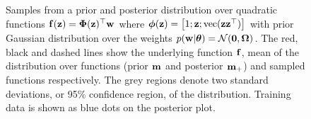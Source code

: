 \begin{figure}[t]
\centering
\small
{}
\hfill
{}
\caption{Samples from a prior and posterior distribution over quadratic functions $\mathbf{f}(\mathbf{z}) = \boldsymbol{\Phi}(\mathbf{z})^\top\mathbf{w}$ where $\boldsymbol{\phi}(\mathbf{z}) = \big[1; \mathbf{z}; \mathrm{vec}(\mathbf{z}\mathbf{z}^\top)\big]$ with prior Gaussian distribution over the weights $p(\mathbf{w}|\boldsymbol{\theta}) = \mathcal{N}(\mathbf{0},\boldsymbol{\Omega})$.  The red, black and dashed lines show the underlying function $\mathbf{f}$, mean of the distribution over functions (prior $\mathbf{m}$ and posterior $\mathbf{m}_+$) and sampled functions respectively. The grey regions denote two standard deviations, or 95\% confidence region, of the distribution. Training data is shown as blue dots on the posterior plot.}
\label{fig:linearprior}
\end{figure}
